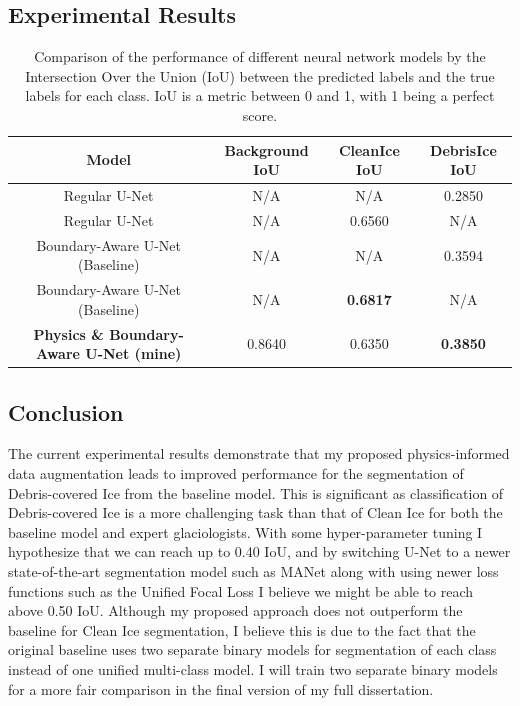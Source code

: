 \subsection{Experimental Results}


\begin{table}[!ht]
    \centering
    \begin{tabular}{c|c|c|c}
        Model & Background IoU & CleanIce IoU & DebrisIce IoU \\ \hline
        Regular U-Net & N/A & N/A & 0.2850 \\ \hline
        Regular U-Net & N/A & 0.6560 & N/A \\ \hline
        Boundary-Aware U-Net (Baseline) & N/A & N/A & 0.3594 \\ \hline
        Boundary-Aware U-Net (Baseline) & N/A & \textbf{0.6817} & N/A \\ \hline
        \textbf{Physics \& Boundary-Aware U-Net (mine)} & 0.8640 & 0.6350 & \textbf{0.3850} \\ \hline
        
    \end{tabular}
    \caption{Comparison of the performance of different neural network models by the Intersection Over the Union (IoU) between the predicted labels and the true labels for each class. IoU is a metric between 0 and 1, with 1 being a perfect score.}
    \label{tab:my_label}
\end{table}

\subsection{Conclusion}
The current experimental results demonstrate that my proposed physics-informed data augmentation leads to improved performance for the segmentation of Debris-covered Ice from the baseline model. This is significant as classification of Debris-covered Ice is a more challenging task than that of Clean Ice for both the baseline model and expert glaciologists. With some hyper-parameter tuning I hypothesize that we can reach up to 0.40 IoU, and by switching U-Net to a newer state-of-the-art segmentation model such as MANet \cite{MANet} along with using newer loss functions such as the Unified Focal Loss \cite{UnifiedLoss} I believe we might be able to reach above 0.50 IoU. Although my proposed approach does not outperform the baseline for Clean Ice segmentation, I believe this is due to the fact that the original baseline uses two separate binary models for segmentation of each class instead of one unified multi-class model. I will train two separate binary models for a more fair comparison in the final version of my full dissertation.
